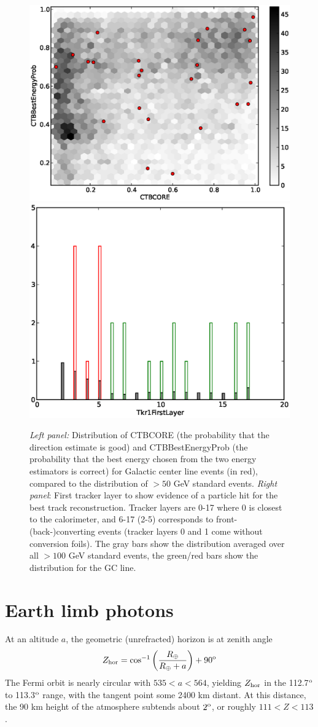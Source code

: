 \documentclass[aps,twocolumn,prd,superscriptaddress,showpacs,nofootinbib,fixfloat]{revtex4}
\newcommand{\be}{\begin{equation}}
\newcommand{\ee}{\end{equation}}
\newcommand{\degree}{^{\rm o}}
\begin{document}
\begin{figure}
  \centering
  \includegraphics[width=0.48\linewidth]{plots/CTBCORE_CTBBestEnergyProb.eps}
  \includegraphics[width=0.48\linewidth]{plots/Tkr1FirstLayer.eps}
  \caption{\emph{Left panel:} Distribution of CTBCORE (the probability that
  the direction estimate is good) and CTBBestEnergyProb (the probability that
  the best energy chosen from the two energy estimators is correct) for
  Galactic center line events (in red), compared to the distribution of $>50$
  GeV standard events.  \emph{Right panel}: First tracker layer to show
  evidence of a particle hit for the best track reconstruction. Tracker layers
  are 0-17 where 0 is closest to the calorimeter, and 6-17 (2-5) corresponds
  to front- (back-)converting events (tracker layers 0 and 1 come without
  conversion foils). The gray bars show the distribution averaged over all
  $>100$ GeV standard events, the green/red bars show the distribution for the
  GC line.}
  \label{fig:CTBquality}
\end{figure}

\clearpage
\section{Earth limb photons}
At an altitude $a$, the geometric (unrefracted) horizon is at zenith angle
\be
Z_{\rm hor} = \cos^{-1}\left(\frac{R_\oplus}{R_\oplus+a}\right)+90\degree
\ee
The Fermi orbit is nearly circular with $535 < a < 564$, yielding $Z_{\rm
  hor}$ in the 112.7$\degree$ to 113.3$\degree$ range, with the tangent point
some 2400 km distant.  At this distance, the 90 km height of the atmosphere
subtends about $2\degree$, or roughly $111 < Z < 113$.  
\end{document}
